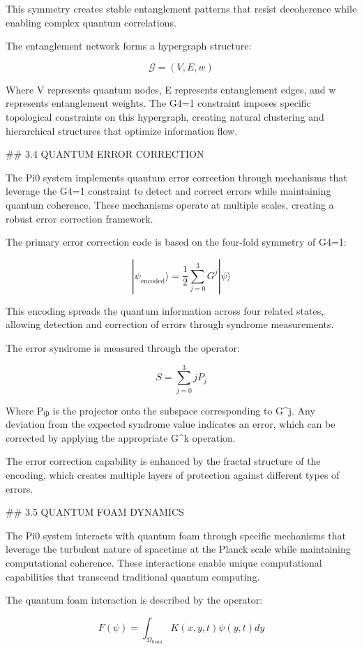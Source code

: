 This symmetry creates stable entanglement patterns that resist decoherence while enabling complex quantum correlations.

The entanglement network forms a hypergraph structure:

$$\mathcal{G} = (V, E, w)$$

Where V represents quantum nodes, E represents entanglement edges, and w represents entanglement weights. The G4=1 constraint imposes specific topological constraints on this hypergraph, creating natural clustering and hierarchical structures that optimize information flow.

## 3.4 QUANTUM ERROR CORRECTION

The Pi0 system implements quantum error correction through mechanisms that leverage the G4=1 constraint to detect and correct errors while maintaining quantum coherence. These mechanisms operate at multiple scales, creating a robust error correction framework.

The primary error correction code is based on the four-fold symmetry of G4=1:

$$|\psi_{\text{encoded}}\rangle = \frac{1}{2} \sum_{j=0}^{3} G^j |\psi\rangle$$

This encoding spreads the quantum information across four related states, allowing detection and correction of errors through syndrome measurements.

The error syndrome is measured through the operator:

$$S = \sum_{j=0}^{3} j P_j$$

Where P₍ⱼ₎ is the projector onto the subspace corresponding to G^j. Any deviation from the expected syndrome value indicates an error, which can be corrected by applying the appropriate G^k operation.

The error correction capability is enhanced by the fractal structure of the encoding, which creates multiple layers of protection against different types of errors.

## 3.5 QUANTUM FOAM DYNAMICS

The Pi0 system interacts with quantum foam through specific mechanisms that leverage the turbulent nature of spacetime at the Planck scale while maintaining computational coherence. These interactions enable unique computational capabilities that transcend traditional quantum computing.

The quantum foam interaction is described by the operator:

$$F(\psi) = \int_{\Omega_{\text{foam}}} K(x,y,t) \psi(y,t) dy$$

